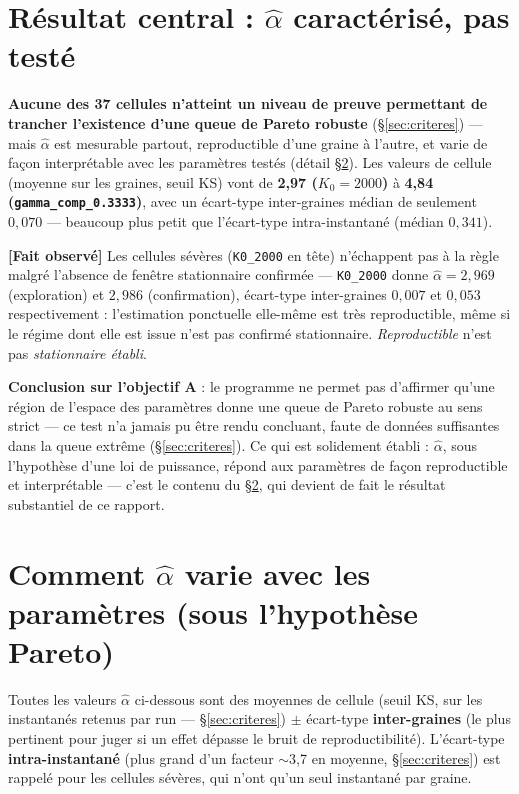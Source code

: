 \documentclass[11pt,a4paper]{article}
\newcommand{\code}[1]{\texttt{#1}}
\newcommand{\fait}{\textbf{[Fait observé]}}
\begin{document}
\section{Résultat central : $\hat\alpha$ caractérisé, pas testé}
\label{sec:resultat}

\textbf{Aucune des 37 cellules n'atteint un niveau de preuve permettant
de trancher l'existence d'une queue de Pareto robuste} (\S\ref{sec:criteres})
--- mais $\hat\alpha$ est mesurable partout, reproductible d'une graine
à l'autre, et varie de façon interprétable avec les paramètres testés
(détail \S\ref{sec:parametres}). Les valeurs de cellule (moyenne sur les
graines, seuil KS) vont de \textbf{2,97 ($K_0=2000$)} à \textbf{4,84
(\code{gamma\_comp\_0.3333})}, avec un écart-type inter-graines médian
de seulement $0{,}070$ --- beaucoup plus petit que l'écart-type
intra-instantané (médian $0{,}341$).

\fait{} Les cellules sévères (\code{K0\_2000} en tête) n'échappent pas
à la règle malgré l'absence de fenêtre stationnaire confirmée ---
\code{K0\_2000} donne $\hat\alpha=2{,}969$ (exploration) et $2{,}986$
(confirmation), écart-type inter-graines $0{,}007$ et $0{,}053$
respectivement : l'estimation ponctuelle elle-même est très
reproductible, même si le régime dont elle est issue n'est pas confirmé
stationnaire. \emph{Reproductible} n'est pas \emph{stationnaire établi}.

\textbf{Conclusion sur l'objectif A} : le programme ne permet pas
d'affirmer qu'une région de l'espace des paramètres donne une queue de
Pareto robuste au sens strict --- ce test n'a jamais pu être rendu
concluant, faute de données suffisantes dans la queue extrême
(\S\ref{sec:criteres}). Ce qui est solidement établi : $\hat\alpha$,
sous l'hypothèse d'une loi de puissance, répond aux paramètres de façon
reproductible et interprétable --- c'est le contenu du
\S\ref{sec:parametres}, qui devient de fait le résultat substantiel de
ce rapport.

\section{Comment $\hat\alpha$ varie avec les paramètres (sous l'hypothèse Pareto)}
\label{sec:parametres}

Toutes les valeurs $\hat\alpha$ ci-dessous sont des moyennes de cellule
(seuil KS, sur les instantanés retenus par run --- \S\ref{sec:criteres})
$\pm$ écart-type \textbf{inter-graines} (le plus pertinent pour juger si
un effet dépasse le bruit de reproductibilité). L'écart-type
\textbf{intra-instantané} (plus grand d'un facteur $\sim$3,7 en moyenne,
\S\ref{sec:criteres}) est rappelé pour les cellules sévères, qui n'ont
qu'un seul instantané par graine.
\end{document}
